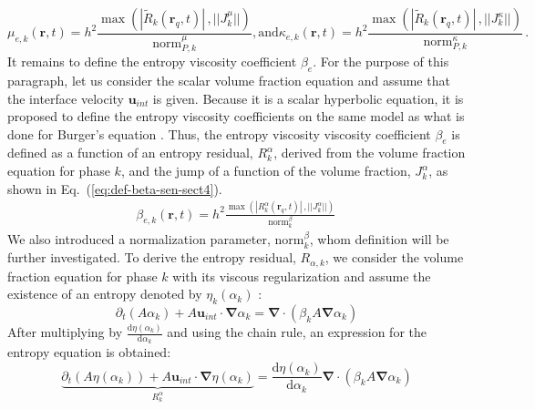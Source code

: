 \documentclass[preprint,10pt]{elsarticle}
\renewcommand{\div}{\mbold{\nabla}\! \cdot \!}
\newcommand{\grad}{\mbold{\nabla}}
\newcommand{\mbold}[1]{\boldsymbol#1}
\newcommand{\norm}{\textrm{norm}}
\newcommand{\resi}{R}
\newcommand{\resinew}{\widetilde{\resi}}
\newcommand{\eqt}[1]{Eq.~(\ref{#1})}                     %
\begin{document}
%
\begin{subequations}\label{eq:visc_definition-sct4}
\begin{equation}
\mu_{e,k}(\mbold r,t)    = h^2 \frac{\max\left( | \resinew_k(\mbold r_q,t) |\,, || J_k^\mu || \right)}{\norm_{P,k}^\mu},
\end{equation} 
\text{and} 
\begin{equation}
\kappa_{e,k}(\mbold r,t) = h^2 \frac{\max\left( | \resinew_k(\mbold r_q,t) |\,, || J_k^\kappa || \right)}{\norm_{P,k}^\kappa} \, .
\end{equation}
\end{subequations}
%
It remains to define the entropy viscosity coefficient $\beta_e$. For the purpose of this paragraph, let us consider the scalar volume fraction equation and assume that the interface velocity $\mbold u_{int}$ is given. Because it is a scalar hyperbolic equation, it is proposed to define the entropy viscosity coefficients on the same model as what is done for Burger's equation \cite{jlg1, jlg2}. Thus, the entropy viscosity viscosity coefficient $\beta_e$ is defined as a function of an entropy residual, $R_{k}^\alpha$, derived from the volume fraction equation for phase $k$, and the jump of a function of the volume fraction, $J_k^\alpha$, as shown in \eqt{eq:def-beta-sen-sect4}.
%
\begin{align}\label{eq:def-beta-sen-sect4}
\beta_{e,k}( \mbold r, t) = h^2 \frac{\max\left( | R_{k}^\alpha(\mbold r_q,t) |\,, || J_k^\alpha|| \right)}{\norm_{k}^\beta} \,
\end{align}
%
We also introduced a normalization parameter, $\norm_{k}^\beta$, whom definition will be further investigated. To derive the entropy residual, $R_{\alpha,k}$, we consider the volume fraction equation for phase $k$ with its viscous regularization and assume the existence of an entropy denoted by $\eta_k(\alpha_k)$ \cite{Leveque}:
%
\begin{equation}\label{eq:vf-sem-sct4}
\partial_t \left(A \alpha_k \right) + A \mbold u_{int} \cdot \grad \alpha_k = \div \left( \beta_k A \grad \alpha_k \right)
\end{equation}
% 
After multiplying by $\frac{\text{d} \eta (\alpha_k)}{\text{d} \alpha_k}$ and using the chain rule, an expression for the entropy equation is obtained:
%
\begin{equation}\label{eq:vf-sem2-sct4}
\underbrace{\partial_t \left(A \eta(\alpha_k) \right) + A \mbold u_{int} \cdot \grad \eta(\alpha_k)}_{R_{k}^\alpha} = \frac{\text{d} \eta (\alpha_k)}{\text{d} \alpha_k} \div \left( \beta_k A \grad \alpha_k \right)
\end{equation}
\end{document}
